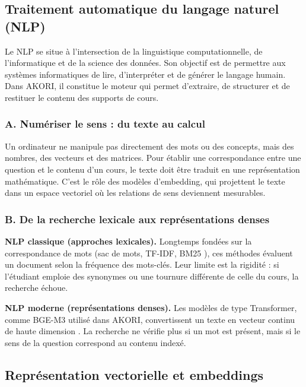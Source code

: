 \documentclass[12pt,a4paper,oneside]{report}
\begin{document}
\subsection{Traitement automatique du langage naturel (NLP)}

Le NLP se situe à l'intersection de la linguistique computationnelle, de l'informatique et de la science des données. Son objectif est de permettre aux systèmes informatiques de lire, d'interpréter et de générer le langage humain. Dans AKORI, il constitue le moteur qui permet d'extraire, de structurer et de restituer le contenu des supports de cours.

\subsubsection*{A. Numériser le sens : du texte au calcul}

Un ordinateur ne manipule pas directement des mots ou des concepts, mais des nombres, des vecteurs et des matrices. Pour établir une correspondance entre une question et le contenu d'un cours, le texte doit être traduit en une représentation mathématique. C'est le rôle des modèles d'embedding, qui projettent le texte dans un espace vectoriel où les relations de sens deviennent mesurables.

\subsubsection*{B. De la recherche lexicale aux représentations denses}

\textbf{NLP classique (approches lexicales).} Longtemps fondées sur la correspondance de mots (sac de mots, TF-IDF, BM25 \cite{robertson2009bm25}), ces méthodes évaluent un document selon la fréquence des mots-clés. Leur limite est la rigidité : si l'étudiant emploie des synonymes ou une tournure différente de celle du cours, la recherche échoue.

\textbf{NLP moderne (représentations denses).} Les modèles de type Transformer, comme BGE-M3 utilisé dans AKORI, convertissent un texte en vecteur continu de haute dimension \cite{reimers2019sbert,karpukhin2020dpr}. La recherche ne vérifie plus si un mot est présent, mais si le sens de la question correspond au contenu indexé.

\subsection{Représentation vectorielle et embeddings}
\end{document}
